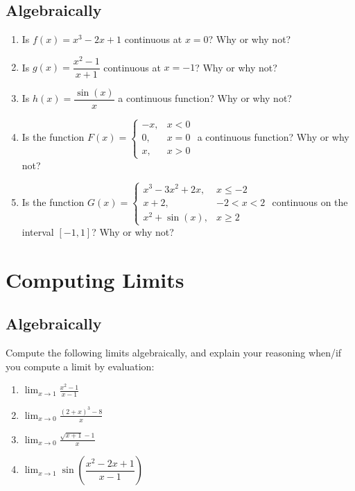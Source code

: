 \documentclass[12pt]{exam}
\begin{document}
\subsection{Algebraically}
\begin{enumerate}
  \item Is $f(x) = x^3 - 2x + 1$ continuous at $x = 0$? Why or why not?

\item Is $g(x) = \dfrac{x^2 - 1}{x + 1}$ continuous at $x = -1$? Why or why not?

\item Is $h(x) = \dfrac{\sin(x)}{x}$ a continuous function? Why or why not?

\item Is the function $F(x) = \begin{cases} -x, & x < 0 \\ 0, & x = 0 \\ x, & x > 0 \end{cases}$ a continuous function? Why or why not?

\item Is the function $G(x) = \begin{cases} x^3 - 3x^2 + 2x, & x \leq -2 \\ x + 2, & -2 < x < 2 \\ x^2 + \sin(x), & x \geq 2 \end{cases}$
  continuous on the interval $[-1, 1]$? Why or why not?
\end{enumerate}
\newpage

\section{Computing Limits}
\subsection{Algebraically}
Compute the following limits algebraically, and explain your reasoning when/if you compute a limit by evaluation:

\begin{enumerate}
  \item $\displaystyle\lim_{x\to 1}\frac{x^2-1}{x-1}$

\vfill

\item $\displaystyle\lim_{x\to 0}\frac{(2+x)^3-8}{x}$

\vfill

\item $\displaystyle\lim_{x\to0}\frac{\sqrt{x+1}-1}{x}$

\vfill

\item $\displaystyle\lim_{x \rightarrow 1} \sin\left(\dfrac{x^2 - 2x + 1}{x - 1}\right)$

\end{enumerate}
\newpage
\end{document}
